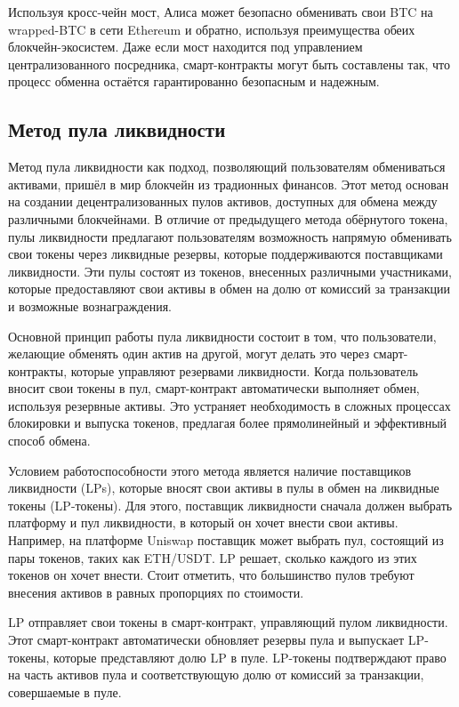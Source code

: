 Используя кросс-чейн мост, Алиса может безопасно обменивать свои BTC на wrapped-BTC в сети Ethereum и обратно, используя преимущества обеих блокчейн-экосистем. Даже если мост находится под управлением централизованного посредника, смарт-контракты могут быть составлены так, что процесс обменна остаётся гарантированно безопасным и надежным.

\subsection{Метод пула ликвидности}

Метод пула ликвидности как подход, позволяющий пользователям обмениваться активами, пришёл в мир блокчейн из традионных финансов. Этот метод основан на создании децентрализованных пулов активов, доступных для обмена между различными блокчейнами. В отличие от предыдущего метода обёрнутого токена, пулы ликвидности предлагают пользователям возможность напрямую обменивать свои токены через ликвидные резервы, которые поддерживаются поставщиками ликвидности. Эти пулы состоят из токенов, внесенных различными участниками, которые предоставляют свои активы в обмен на долю от комиссий за транзакции и возможные вознаграждения.

Основной принцип работы пула ликвидности состоит в том, что пользователи, желающие обменять один актив на другой, могут делать это через смарт-контракты, которые управляют резервами ликвидности. Когда пользователь вносит свои токены в пул, смарт-контракт автоматически выполняет обмен, используя резервные активы. Это устраняет необходимость в сложных процессах блокировки и выпуска токенов, предлагая более прямолинейный и эффективный способ обмена.

Условием работоспособности этого метода является наличие поставщиков ликвидности (LPs), которые вносят свои активы в пулы в обмен на ликвидные токены (LP-токены). Для этого, поставщик ликвидности сначала должен выбрать платформу и пул ликвидности, в который он хочет внести свои активы. Например, на платформе Uniswap поставщик может выбрать пул, состоящий из пары токенов, таких как ETH/USDT. LP решает, сколько каждого из этих токенов он хочет внести. Стоит отметить, что большинство пулов требуют внесения активов в равных пропорциях по стоимости.

LP отправляет свои токены в смарт-контракт, управляющий пулом ликвидности. Этот смарт-контракт автоматически обновляет резервы пула и выпускает LP-токены, которые представляют долю LP в пуле. LP-токены подтверждают право на часть активов пула и соответствующую долю от комиссий за транзакции, совершаемые в пуле.

